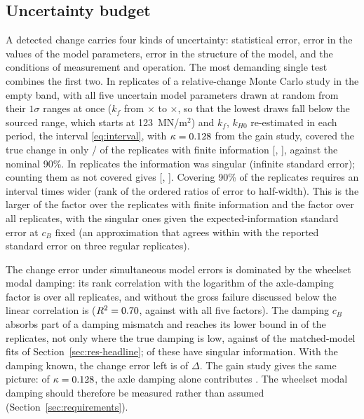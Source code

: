\subsection{Uncertainty budget}\label{sec:res-budget}
A detected change carries four kinds of uncertainty: statistical error, error in the values of the model
parameters, error in the structure of the model, and the conditions of measurement and operation. The
most demanding single test combines the first two. In \KapCoestNAll{} replicates of a relative-change
Monte Carlo study in the empty band, with all five uncertain model parameters drawn at random from their
$1\sigma$ ranges at once ($k_f$ from $\times$\KapCoestKfMin{} to $\times$\KapCoestKfMax{}, so that the
lowest draws fall below the sourced range, which starts at 123~MN/m$^2$) and $k_f$, $k_{H0}$ re-estimated
in each period, the interval \eqref{eq:interval}, with $\kappa=0.128$ from the gain study,
covered the true change in only \KapCoestCovered/\KapCoestN{} of the replicates with finite information
[\KapCoestLo, \KapCoestHi], against the nominal 90\%. In \KapCoestNSing{} replicates the information was
singular (infinite standard error); counting them as not covered gives \KapCoestCovSingMiss{}
[\KapCoestCovSingMissLo, \KapCoestCovSingMissHi]. Covering 90\% of the replicates requires an interval
\KapInflNinety{} times wider (rank \KapInflRank{} of the \KapInflOf{} ordered ratios of error to
half-width). This is the larger of the factor over the replicates with finite information and the factor
over all replicates, with the singular ones given the expected-information standard error at $c_B$ fixed
(an approximation that agrees within \KapSingSECheckMaxDev{} with the reported standard error on three
regular replicates).

The change error under simultaneous model errors is dominated by the wheelset modal damping: its rank
correlation with the logarithm of the axle-damping factor is \KapAttrAxleSpearman{} over all replicates,
and without the gross failure discussed below the linear correlation is \KapAttrAxleCorr{}
($R^2=0.70$, against \KapAttrAllRsq{} with all five factors). The damping $c_B$ absorbs part
of a damping mismatch and reaches its lower bound in \KapCBBoundN{} of the \KapCoestNAll{} replicates,
not only where the true damping is low, against \HLCBBoundN{} of the \HLCBBoundOf{} matched-model fits
of Section~\ref{sec:res-headline}; \KapCoestNSing{} of these have singular information. With the damping
known, the change error left is \KapAttrResidRMS{} of $\Delta$. The gain study gives the same picture:
of $\kappa=0.128$, the axle damping alone contributes \KapGainAxle. The wheelset modal damping
should therefore be measured rather than assumed (Section~\ref{sec:requirements}).

